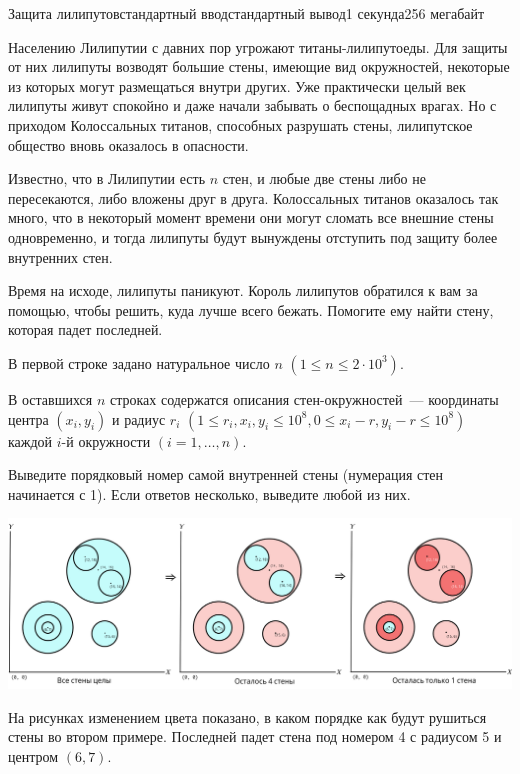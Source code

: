 \begin{problem}{Защита лилипутов}{стандартный ввод}{стандартный вывод}{1 секунда}{256 мегабайт}

Населению Лилипутии с давних пор угрожают титаны-лилипутоеды. Для защиты от них лилипуты возводят большие стены, имеющие вид окружностей, некоторые из которых могут размещаться внутри других. Уже практически целый век лилипуты живут спокойно и даже начали забывать о беспощадных врагах. Но с приходом Колоссальных титанов, способных разрушать стены, лилипутское общество вновь оказалось в опасности.

Известно, что в Лилипутии есть $n$ стен, и любые две стены либо не пересекаются, либо вложены друг в друга. Колоссальных титанов оказалось так много, что в некоторый момент времени они могут сломать все внешние стены одновременно, и тогда лилипуты будут вынуждены отступить под защиту более внутренних стен. 

Время на исходе, лилипуты паникуют. Король лилипутов обратился к вам за помощью, чтобы решить, куда лучше всего бежать. Помогите ему найти стену, которая падет последней. 



\InputFile
В первой строке задано натуральное число $n$ $(1 \leq n \leq 2 \cdot 10^3)$. 

В оставшихся $n$ строках содержатся описания стен-окружностей~--- координаты центра $(x_{i}, y_{i})$ и радиус $r_{i}$ $(1 \leq r_{i}, x_{i}, y_{i} \leq 10^8, 0\leq x_{i} - r, y_{i} - r \leq 10^8)$ каждой $i$-й окружности $(i = 1, \dots, n)$.

\OutputFile
Выведите порядковый номер самой внутренней стены (нумерация стен начинается с 1). Если ответов несколько, выведите любой из них.

\Examples

\begin{example}
%
%
\end{example}

\Note
\begin{center}
  \includegraphics[width=18cm]{sample2.png}
\end{center}
На рисунках изменением цвета показано, в каком порядке как будут рушиться стены во втором примере. Последней падет стена под номером 4 с радиусом 5 и центром $(6, 7)$.

\end{problem}

